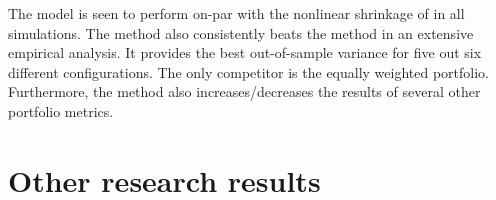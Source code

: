 \documentclass[12pt, oneside]{book}\usepackage{knitr}
\begin{document}
{The model is seen to perform on-par with the nonlinear shrinkage of \citet{lw20} in all simulations.
The method also consistently beats the \citet{lw20} method in an extensive empirical analysis.
It provides the best out-of-sample variance for five out six different configurations. 
The only competitor is the equally weighted portfolio.
Furthermore, the method also increases/decreases the results of several other portfolio metrics.


\section{Other research results}\label{sec:other_results}

}
\end{document}
